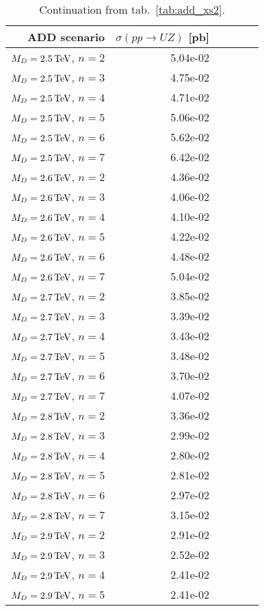 \begin{table}[hbtp]
  \caption{
    Continuation from tab.~\ref{tab:add_xs2}.
  }
  \label{tab:add_xs3}
  \begin{center}
{\footnotesize
  \begin{tabular}{rrrrrr}
\hline 
ADD scenario              & $\sigma(pp\rightarrow UZ)$ [pb]\\
\hline
$M_{D} = 2.5 \,\text{Te\hspace{-.08em}V}$, $n=2$  & 5.04e-02 \\
$M_{D} = 2.5 \,\text{Te\hspace{-.08em}V}$, $n=3$  & 4.75e-02 \\
$M_{D} = 2.5 \,\text{Te\hspace{-.08em}V}$, $n=4$  & 4.71e-02 \\
$M_{D} = 2.5 \,\text{Te\hspace{-.08em}V}$, $n=5$  & 5.06e-02 \\
$M_{D} = 2.5 \,\text{Te\hspace{-.08em}V}$, $n=6$  & 5.62e-02 \\
$M_{D} = 2.5 \,\text{Te\hspace{-.08em}V}$, $n=7$  & 6.42e-02 \\
$M_{D} = 2.6 \,\text{Te\hspace{-.08em}V}$, $n=2$  & 4.36e-02 \\
$M_{D} = 2.6 \,\text{Te\hspace{-.08em}V}$, $n=3$  & 4.06e-02 \\
$M_{D} = 2.6 \,\text{Te\hspace{-.08em}V}$, $n=4$  & 4.10e-02 \\
$M_{D} = 2.6 \,\text{Te\hspace{-.08em}V}$, $n=5$  & 4.22e-02 \\
$M_{D} = 2.6 \,\text{Te\hspace{-.08em}V}$, $n=6$  & 4.48e-02 \\
$M_{D} = 2.6 \,\text{Te\hspace{-.08em}V}$, $n=7$  & 5.04e-02 \\
$M_{D} = 2.7 \,\text{Te\hspace{-.08em}V}$, $n=2$  & 3.85e-02 \\
$M_{D} = 2.7 \,\text{Te\hspace{-.08em}V}$, $n=3$  & 3.39e-02 \\
$M_{D} = 2.7 \,\text{Te\hspace{-.08em}V}$, $n=4$  & 3.43e-02 \\
$M_{D} = 2.7 \,\text{Te\hspace{-.08em}V}$, $n=5$  & 3.48e-02 \\
$M_{D} = 2.7 \,\text{Te\hspace{-.08em}V}$, $n=6$  & 3.70e-02 \\
$M_{D} = 2.7 \,\text{Te\hspace{-.08em}V}$, $n=7$  & 4.07e-02 \\
$M_{D} = 2.8 \,\text{Te\hspace{-.08em}V}$, $n=2$  & 3.36e-02 \\
$M_{D} = 2.8 \,\text{Te\hspace{-.08em}V}$, $n=3$  & 2.99e-02 \\
$M_{D} = 2.8 \,\text{Te\hspace{-.08em}V}$, $n=4$  & 2.80e-02 \\
$M_{D} = 2.8 \,\text{Te\hspace{-.08em}V}$, $n=5$  & 2.81e-02 \\
$M_{D} = 2.8 \,\text{Te\hspace{-.08em}V}$, $n=6$  & 2.97e-02 \\
$M_{D} = 2.8 \,\text{Te\hspace{-.08em}V}$, $n=7$  & 3.15e-02 \\
$M_{D} = 2.9 \,\text{Te\hspace{-.08em}V}$, $n=2$  & 2.91e-02 \\
$M_{D} = 2.9 \,\text{Te\hspace{-.08em}V}$, $n=3$  & 2.52e-02 \\
$M_{D} = 2.9 \,\text{Te\hspace{-.08em}V}$, $n=4$  & 2.41e-02 \\
$M_{D} = 2.9 \,\text{Te\hspace{-.08em}V}$, $n=5$  & 2.41e-02 \\

\end{tabular}}
\end{center}
\end{table}
